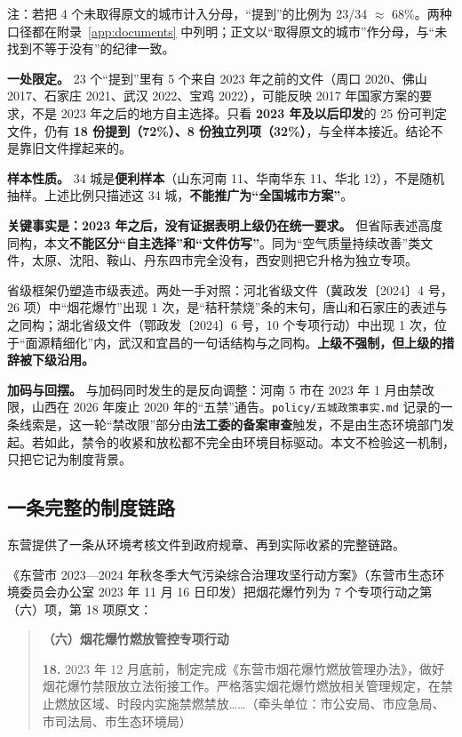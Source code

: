 \noindent 注：若把 4 个未取得原文的城市计入分母，“提到”的比例为 23/34 $\approx$ 68\%。两种口径都在附录~\ref{app:documents} 中列明；正文以“取得原文的城市”作分母，与“未找到不等于没有”的纪律一致。

\noindent \textbf{一处限定。} 23 个“提到”里有 5 个来自 2023 年之前的文件（周口 2020、佛山 2017、石家庄 2021、武汉 2022、宝鸡 2022），可能反映 2017 年国家方案的要求，不是 2023 年之后的地方自主选择。只看 \textbf{2023 年及以后印发}的 25 份可判定文件，仍有 \textbf{18 份提到（72\%）、8 份独立列项（32\%）}，与全样本接近。结论不是靠旧文件撑起来的。

\noindent \textbf{样本性质。} 34 城是\textbf{便利样本}（山东河南 11、华南华东 11、华北 12），不是随机抽样。上述比例只描述这 34 城，\textbf{不能推广为“全国城市方案”}。

\textbf{关键事实是：2023 年之后，没有证据表明上级仍在统一要求。} 但省际表述高度同构，本文\textbf{不能区分“自主选择”和“文件仿写”}。同为“空气质量持续改善”类文件，太原、沈阳、鞍山、丹东四市完全没有，西安则把它升格为独立专项。

省级框架仍塑造市级表述。两处一手对照：河北省级文件（冀政发〔2024〕4 号，26 项）中“烟花爆竹”出现 1 次，是“秸秆禁烧”条的末句，唐山和石家庄的表述与之同构；湖北省级文件（鄂政发〔2024〕6 号，10 个专项行动）中出现 1 次，位于“面源精细化”内，武汉和宜昌的一句话结构与之同构。\textbf{上级不强制，但上级的措辞被下级沿用。}

\textbf{加码与回摆。} 与加码同时发生的是反向调整：河南 5 市在 2023 年 1 月由禁改限，山西在 2026 年废止 2020 年的“五禁”通告。\texttt{policy/五城政策事实.md} 记录的一条线索是，这一轮“禁改限”部分由\textbf{法工委的备案审查}触发，不是由生态环境部门发起。若如此，禁令的收紧和放松都不完全由环境目标驱动。本文不检验这一机制，只把它记为制度背景。

\subsection{一条完整的制度链路}

东营提供了一条从环境考核文件到政府规章、再到实际收紧的完整链路。

《东营市 2023—2024 年秋冬季大气污染综合治理攻坚行动方案》（东营市生态环境委员会办公室 2023 年 11 月 16 日印发）把烟花爆竹列为 7 个专项行动之第（六）项，第 18 项原文：

\begin{quote}
\textbf{（六）烟花爆竹燃放管控专项行动}

\textbf{18.} 2023 年 12 月底前，制定完成《东营市烟花爆竹燃放管理办法》，做好烟花爆竹禁限放立法衔接工作。严格落实烟花爆竹燃放相关管理规定，在禁止燃放区域、时段内实施禁燃禁放……（牵头单位：市公安局、市应急局、市司法局、市生态环境局）
\end{quote}


